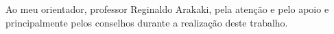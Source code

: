 \begin{agradecimentos}

Ao meu orientador, professor Reginaldo Arakaki, pela atenção e pelo apoio e
principalmente pelos conselhos durante a realização deste trabalho.

\end{agradecimentos}
